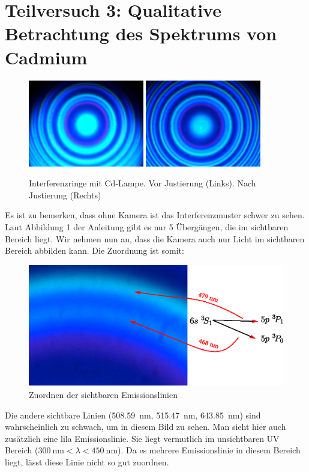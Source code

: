 \section{Teilversuch 3: Qualitative Betrachtung des Spektrums von Cadmium}
	\begin{figure}[!ht]
	    \centering
	    \includegraphics[width=0.45\textwidth]{images/Capture_808.bmp.jpg}
	    \hspace{1em}
	    \includegraphics[width=0.45\textwidth]{images/Capture_809.bmp.jpg}
	    \caption{Interferenzringe mit Cd-Lampe. Vor Justierung (Links). Nach Justierung (Rechts)}
	    \label{fig:laser-interference}
	\end{figure}
	Es ist zu bemerken, dass ohne Kamera ist das Interferenzmuster schwer zu sehen. Laut Abbildung 1 der Anleitung gibt es nur 5 Übergängen, die im sichtbaren Bereich liegt. Wir nehmen nun an, dass die Kamera auch nur Licht im sichtbaren Bereich abbilden kann. 
	\newpage
	Die Zuordnung ist somit:
	\begin{figure}[!ht]
	    \centering
	    \includegraphics{images/tv3.eps}
	    \caption{Zuordnen der sichtbaren Emissionslinien}
	    \label{fig:zuordnen}
	\end{figure}

	Die andere sichtbare Linien (\SI{508.59}{\nano\meter}, \SI{515.47}{\nano\meter}, \SI{643.85}{\nano\meter}) sind wahrscheinlich zu schwach, um in diesem Bild zu sehen. Man sieht hier auch zusätzlich eine lila Emissionslinie. Sie liegt vermutlich im unsichtbaren UV Bereich ($\SI{300}{\nano\meter} < \lambda < \SI{450}{\nano\meter}$). Da es mehrere Emissionslinie in diesem Bereich liegt, lässt diese Linie nicht so gut zuordnen.


